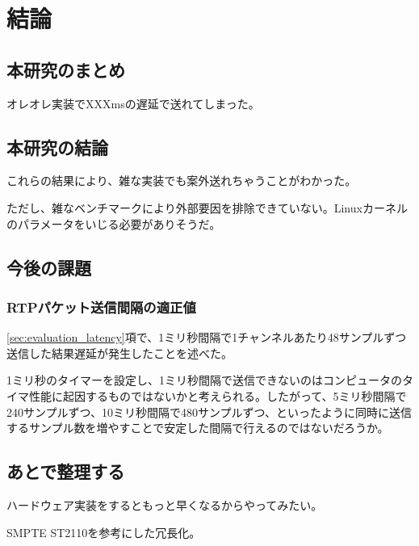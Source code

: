 \chapter{結論}
\label{chap:conclusion}

\section{本研究のまとめ}
\label{section:conclusion}

オレオレ実装でXXXmsの遅延で送れてしまった。

\section{本研究の結論}

これらの結果により、雑な実装でも案外送れちゃうことがわかった。

ただし、雑なベンチマークにより外部要因を排除できていない。Linuxカーネルのパラメータをいじる必要がありそうだ。

\section{今後の課題}

\subsection{RTPパケット送信間隔の適正値}

\ref{sec:evaluation_latency}項で、1ミリ秒間隔で1チャンネルあたり48サンプルずつ送信した結果遅延が発生したことを述べた。

1ミリ秒のタイマーを設定し、1ミリ秒間隔で送信できないのはコンピュータのタイマ性能に起因するものではないかと考えられる。したがって、5ミリ秒間隔で240サンプルずつ、10ミリ秒間隔で480サンプルずつ、といったように同時に送信するサンプル数を増やすことで安定した間隔で行えるのではないだろうか。

\section{あとで整理する}

ハードウェア実装をするともっと早くなるからやってみたい。

SMPTE ST2110を参考にした冗長化。
